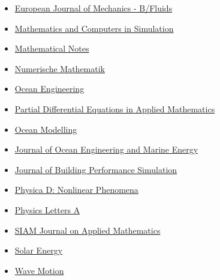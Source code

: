 \documentclass[final, a4paper, oneside, 12pt]{article}
\numberwithin{equation}{section}
\begin{document}
\begin{itemize}
    \item  \href{http://www.elsevier.com/wps/find/journaldescription.cws_home/600738/description}%
    {European Journal of Mechanics - B/Fluids}
    
    \item \href{http://www.elsevier.com/wps/find/journaldescription.cws_home/505615/description#description}%
    {Mathematics and Computers in Simulation}

    \item \href{https://link.springer.com/journal/11006/}{Mathematical Notes}
    
    \item \href{http://www.springerlink.com/content/100497/}%
    {Numerische Mathematik}
    
    \item \href{http://www.journals.elsevier.com/ocean-engineering/}%
    {Ocean Engineering}

    \item \href{https://www.sciencedirect.com/journal/partial-differential-equations-in-applied-mathematics/}{Partial Differential Equations in Applied Mathematics}
    
    \item \href{http://www.elsevier.com/wps/find/journaldescription.cws_home/601376/description#description}%
    {Ocean Modelling}
    
    \item \href{http://www.springer.com/engineering/civil+engineering/journal/40722/}{Journal of Ocean Engineering and Marine Energy}
    
    \item \href{https://www.tandfonline.com/toc/tbps20/current/}{Journal of Building Performance Simulation}

    \item \href{https://www.sciencedirect.com/journal/physica-d-nonlinear-phenomena/}{Physica D: Nonlinear Phenomena}
    
    \item \href{http://www.journals.elsevier.com/physics-letters-a/}{Physics Letters A}
    
    \item \href{http://www.siam.org/journals/siap.php}{SIAM Journal on Applied Mathematics}

    \item \href{https://www.sciencedirect.com/journal/solar-energy/}{Solar Energy}
  
    \item \href{http://www.elsevier.com/locate/wavemoti}%
    {Wave Motion}
    

\end{itemize}
\end{document}
